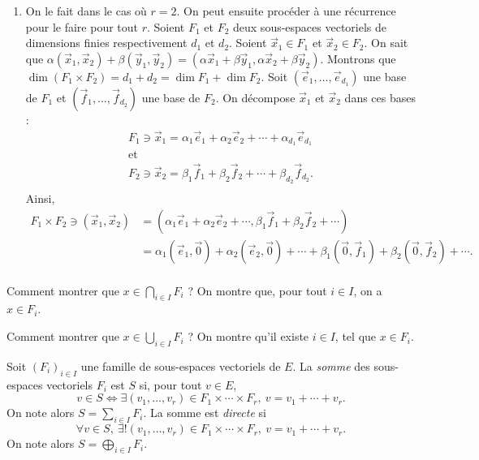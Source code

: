 \begin{exo}
\begin{enumerate}
\begin{enumerate}
			\end{enumerate}
		\item On le fait dans le cas où $r = 2$. On peut ensuite procéder à une récurrence pour le faire pour tout $r$. Soient $F_1$\/ et $F_2$\/ deux sous-espaces vectoriels de dimensions finies respectivement $d_1$\/ et $d_2$. Soient $\vec{x}_1 \in F_1$\/ et $\vec{x}_2 \in F_2$. On sait que $\alpha (\vec{x}_1, \vec{x}_2) + \beta(\vec{y}_1, \vec{y}_2) = (\alpha \vec{x}_1 + \beta \vec{y}_1, \alpha \vec{x}_2 + \beta \vec{y}_2)$. Montrons que $\dim(F_1 \times F_2) = d_1 + d_2 = \dim F_1 + \dim F_2$.
			Soit $(\vec{e}_1, \ldots, \vec{e}_{d_1})$\/ une base de $F_1$\/ et $(\vec{f}_1, \ldots, \vec{f}_{d_2})$\/ une base de $F_2$. On décompose $\vec{x}_1$\/ et $\vec{x}_2$\/ dans ces bases :
			\begin{gather*}
				F_1 \ni \vec{x}_1 = \alpha_1 \vec{e}_1 + \alpha_2 \vec{e}_2 + \cdots + \alpha_{d_1} \vec{e}_{d_1}\\
				\text{et}\\
				F_2 \ni \vec{x}_2 = \beta_1 \vec{f}_1 + \beta_2 \vec{f}_2 + \cdots + \beta_{d_2} \vec{f}_{d_2}.\\
			\end{gather*}
			Ainsi,
			\begin{align*}
				F_1 \times F_2 \ni (\vec{x}_1, \vec{x}_2) &= (\alpha_1 \vec{e}_1 + \alpha_2 \vec{e}_2 + \cdots, \beta_1 \vec{f}_1 + \beta_2 \vec{f}_2 + \cdots)\\
				&= \alpha_1 (\vec{e}_1,\vec{0}) + \alpha_2(\vec{e}_2, \vec{0}) + \cdots + \beta_1 (\vec{0}, \vec{f}_1) + \beta_2 (\vec{0}, \vec{f}_2) + \cdots. \\
			\end{align*}
	\end{enumerate}
\end{exo}

\begin{rap}
	\noindent Comment montrer que $x \in \bigcap_{i \in  I} F_i$\/ ? On montre que, pour tout $i \in I$, on a $x \in F_i$.

	\noindent Comment montrer que $x \in \bigcup_{i \in  I} F_i$\/ ? On montre qu'il existe $i \in I$, tel que $x \in F_i$.
\end{rap}

\begin{defn}
	Soit $(F_i)_{i\in I}$\/ une famille de sous-espaces vectoriels de $E$.
	La {\it somme}\/ des sous-espaces vectoriels $F_i$\/ est $S$\/ si, pour tout $v \in E$, \[
		v \in S \iff \exists (v_1, \ldots, v_r) \in F_1 \times \cdots \times F_r,\: v = v_1 + \cdots + v_r
	.\] On note alors $S = \sum_{i \in I} F_i$.
	La somme est {\it directe}\/ si \[
		\forall v \in S,\:\exists! (v_1, \ldots, v_r) \in F_1 \times \cdots \times F_r,\: v = v_1 + \cdots + v_r
	.\] On note alors $S = \bigoplus_{i \in I} F_i$.
\end{defn}

